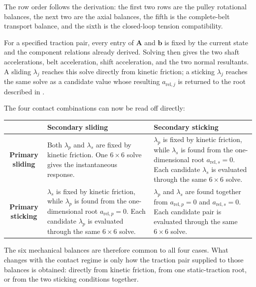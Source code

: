 \documentclass[11pt]{report}
\numberwithin{equation}{section}
\begin{document}
The row order follows the derivation: the first two rows are the pulley
rotational balances, the next two are the axial balances, the fifth is the
complete-belt transport balance, and the sixth is the closed-loop tension
compatibility.

For a specified traction pair, every entry of \(\mathbf A\) and
\(\mathbf b\) is fixed by the current state and the component relations already
derived. Solving  then gives the
two shaft accelerations, belt acceleration, shift acceleration, and the two
normal resultants. A sliding \(\lambda_j\) reaches this solve directly from
kinetic friction; a sticking \(\lambda_j\) reaches the same solve as a
candidate value whose resulting \(a_{\mathrm{rel},j}\) is returned to the
root described in .

The four contact combinations can now be read off directly:

\begin{center}
\small
\renewcommand{\arraystretch}{1.35}
\begin{tabular}{c|p{}|p{}}
    &
    \textbf{Secondary sliding}
    &
    \textbf{Secondary sticking}
    \\ \hline

    \textbf{Primary sliding}
    &
    Both \(\lambda_p\) and \(\lambda_s\) are fixed by kinetic friction.
    One \(6\times6\) solve gives the instantaneous response.
    &
    \(\lambda_p\) is fixed by kinetic friction, while \(\lambda_s\) is found
    from the one-dimensional root \(a_{\mathrm{rel},s}=0\). Each candidate
    \(\lambda_s\) is evaluated through the same \(6\times6\) solve.
    \\ \hline

    \textbf{Primary sticking}
    &
    \(\lambda_s\) is fixed by kinetic friction, while \(\lambda_p\) is found
    from the one-dimensional root \(a_{\mathrm{rel},p}=0\). Each candidate
    \(\lambda_p\) is evaluated through the same \(6\times6\) solve.
    &
    \(\lambda_p\) and \(\lambda_s\) are found together from
    \(a_{\mathrm{rel},p}=0\) and \(a_{\mathrm{rel},s}=0\). Each candidate
    pair is evaluated through the same \(6\times6\) solve.
\end{tabular}
\end{center}

The six mechanical balances are therefore common to all four cases. What
changes with the contact regime is only how the traction pair supplied to
those balances is obtained: directly from kinetic friction, from one
static-traction root, or from the two sticking conditions together.
\end{document}
